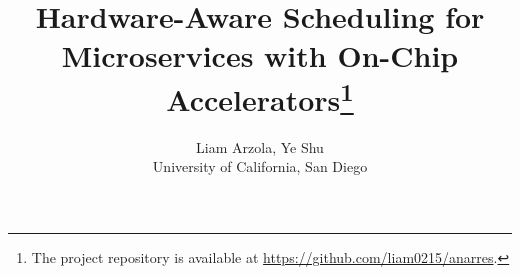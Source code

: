 \documentclass[letterpaper,twocolumn,12pt]{article}
\begin{document}
\date{}
\title{Hardware-Aware Scheduling for Microservices with On-Chip Accelerators\thanks{The project repository is available at \url{https://github.com/liam0215/anarres}.}}

\author{
{\rm Liam Arzola, Ye Shu}\\
University of California, San Diego
}

\maketitle















\end{document}
